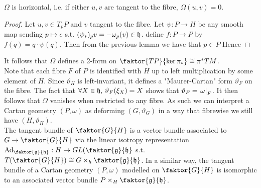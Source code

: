\documentclass{article}
\begin{document}
\begin{corollary}
	$\Omega$ is horizontal, i.e. if either $u,v$ are tangent to the fibre, $\Omega(u,v) = 0$.
\end{corollary}
\begin{proof}
	Let $u,v \in T_pP$ and $v$ tangent to the fibre. Let $\psi : P \to H$ be any smooth map sending  $p \mapsto e$ s.t. $(\psi_\ast)_p v = -\omega_p(v) \in \mathfrak{h}$. define $f: P \to P$ by $f(q) = q \cdot \psi(q)$. Then from the previous lemma we have that $p \in P$ 
	Hence 
\end{proof}
It follows that $\Omega$ defines a 2-form on $\faktor{TP}{\ker \pi_\ast} \cong \pi^\ast  TM$. \\
Note that each fibre $F$ of $P$ is identified with $H$ up to left multiplication by some element of $H$. Since $\vartheta_H$ is left-invariant, it defines a "Maurer-Cartan" form $\vartheta_F$ on the fibre. The fact that $\forall X \in \mathfrak{h}, \, \vartheta_F(\xi_X) = X$ shows that $\vartheta_F = \left. \omega \right\rvert_{F}$. It then follows that $\Omega$ vanishes when restricted to any fibre. As such we can interpret a Cartan geometry $(P,\omega)$ as deforming $(G,\vartheta_G)$ in a way that fibrewise we still have $(H,\vartheta_H)$. \\
The tangent bundle of $\faktor{G}{H}$ is a vector bundle associated to $G \to \faktor{G}{H}$ via the linear isotropy representation $\Ad_{\faktor{\mf{g}}{\mf{h}}} : H \to GL(\faktor{\mf{g}}{\mf{h}}$ s.t. $T(\faktor{G}{H}) \cong G \times_h \faktor{\mf{g}}{\mf{h}}$. In a similar way, the tangent bundle of a Cartan geometry $(P,\omega)$ modelled on $\faktor{G}{H}$ is isomorphic to an associated vector bundle $P \times_H \faktor{\mf{g}}{\mf{h}}$. 
\end{document}
